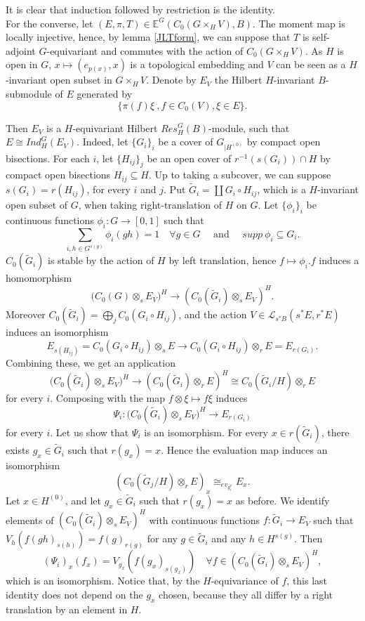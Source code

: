 \begin{dem} It is clear that induction followed by restriction is the identity.\\ 

For the converse, let $(E,\pi,T)\in \mathbb E^G(C_0(G\times_H V),B)$. The moment map is locally injective, hence, by lemma \ref{JLTform}, we can suppose that $T$ is self-adjoint $G$-equivariant and commutes with the action of $C_0(G\times_H V)$. As $H$ is open in $G$, $x\mapsto (e_{p(x)},x)$ is a topological embedding and $V$ can be seen as a $H$-invariant open subset in $G\times_H V$. Denote by $E_V$ the Hilbert $H$-invariant $B$-submodule of $E$ generated by 
\[\{\pi(f)\xi \ ,f\in C_0(V), \xi\in E\}.\]

Then $E_{V}$ is a $H$-equivariant Hilbert $Res_H^G(B)$-module, such that $E\cong Ind_H^G (E_V)$. Indeed, let $\{G_i\}_i$ be a cover of $G_{|H^{(0)}}$ by compact open bisections. For each $i$, let $\{H_{ij}\}_j$ be an open cover of $r^{-1}( s(G_i))\cap H$ by compact open bisections $H_{ij} \subseteq H$. Up to taking a subcover, we can suppose $s(G_i) = r(H_{ij})$, for every $i$ and $j$. Put $\tilde G_i = \coprod G_i \circ H_{ij}$, which is a $H$-invariant open subset of $G$, when taking right-translation of $H$ on $G$. Let $\{\phi_i\}_i$ be continuous functions $\phi_i : G\rightarrow [0,1]$ such that 
\[\sum_{i, h\in G^{s(g)}} \phi_i(gh) = 1\quad \forall g\in G \quad \text{ and } \quad supp \ \phi_i\subseteq G_i .\]
$C_0(\tilde G_i)$ is stable by the action of $H$ by left translation, hence $f\mapsto \phi_i . f$ induces a homomorphism 
\[\Big(C_0(G)\otimes_s E_V\Big)^H \rightarrow \left( C_0(\tilde G_i)\otimes_s E_V\right)^H .\] 
Moreover $C_0(\tilde G_i) = \bigoplus_j C_0(G_i\circ H_{ij})$, and the action $V\in \mathcal L_{s^*B}(s^* E, r^* E)$ induces an isomorphism
\[ E_{s(H_{ij})}=C_0(G_i\circ H_{ij})\otimes_s E \rightarrow C_0(G_i\circ H_{ij})\otimes_r E = E_{r(G_{i})}. \]
Combining these, we get an application 
\[ \Big(C_0(\tilde G_i)\otimes_s E_V\Big)^H \rightarrow (C_0(\tilde G_i)\otimes_r E)^H \cong C_0(\tilde G_i/H)\otimes_r E \]
for every $i$. Composing with the map $f\otimes \xi \mapsto f\xi$ induces
\[\Psi_i : \Big(C_0(\tilde G_i)\otimes_s E_V\Big)^H \rightarrow E_{r(G_i)}\]
for every $i$. 
Let us show that $\Psi_i$ is an isomorphism. For every $x\in r(\tilde G_i)$, there exists $g_x\in \tilde G_i$ such that $r(g_x)=x$. Hence the evaluation map induces an isomorphism 
\[\left( C_0(\tilde G_j / H) \otimes_r E \right)_x \cong_{ev_{g_i^x}} E_x.\] 
Let $x\in H^{(0)}$, and let $g_x \in \tilde G_i$ such that $r(g_x) = x$ as before. We identify elements of $(C_0(\tilde G_i)\otimes_s E_V)^H$ with continuous functions $f : \tilde G_i \rightarrow E_V$ such that $V_h(f(gh)_{s(h)})= f(g)_{r(g)}$ for any $g\in \tilde G_i$ and any $h\in H^{s(g)}$. Then 
\[ (\Psi_i)_x(f_x) = V_{g_x}\left( f(g_{x})_{s(g_x)} \right)\quad \forall f\in \left( C_0(\tilde G_i)\otimes_s E_V\right)^H, \]
which is an isomorphism. Notice that, by the $H$-equivariance of $f$, this last identity does not depend on the $g_x$ chosen, because they all differ by a right translation by an element in $H$. \\


\end{dem}
